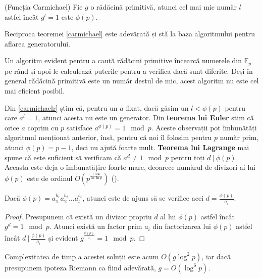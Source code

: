 \begin{thm}
  \label{carmichael}
  (Funcția Carmichael) Fie $g$ o rădăcină primitivă, atunci cel mai mic număr $l$ astfel încât $g^{l} = 1$ este $\phi(p)$.
\end{thm}

\begin{thm}
  \label{carmichaelr}
  Reciproca teoremei \ref{carmichael} este adevărată și stă la baza algoritmului pentru aflarea generatorului.
\end{thm}

Un algoritm evident pentru a caută rădăcini primitive încearcă numerele din $\mathbb{F}_{p}$ pe rând și apoi le calculează
puterile pentru a verifica dacă sunt diferite. Deși în general rădăcină primitivă este un număr destul de mic, acest algoritm
nu este cel mai eficient posibil.

Din \ref{carmichaelr} știm că, pentru un $a$ fixat, dacă găsim un $l < \phi(p)$ pentru care $a^{l} = 1$, atunci acesta nu este un
generator. Din \textbf{teorema lui Euler} știm că orice $a$ coprim cu $p$ satisface $a^{\phi(p)} = 1 \mod p$. Aceste observații pot
îmbunătăți algoritmul menționat anterior, însă, pentru că noi îl folosim pentru $p$ număr prim, atunci $\phi(p) = p - 1$, deci nu
ajută foarte mult. \textbf{Teorema lui Lagrange} mai spune că este suficient să verificam că $a^{d} \neq 1 \mod p$ pentru toți $d \ |\ \phi(p)$.
Aceasta este deja o îmbunatățire foarte mare, deoarece numărul de divizori ai lui $\phi(p)$ este de ordinul $O(p^{\frac{1.066}{\ln \ln p}})$ (\cite{numdivisors}).

Dacă $\phi(p) = a_{1}^{b_{1}} a_{2}^{b_{2}} \ldots a_{t}^{b_{t}}$, atunci este de ajuns să se verifice acei $d = \frac{\phi(p)}{a_{i}}$.

\begin{proof}
  Presupunem că există un divizor propriu $d$ al lui $\phi(p)$ astfel încât $g^{d} = 1 \mod p$. Atunci există un factor prim $a_{i}$
  din factorizarea lui $\phi(p)$ astfel încât $d \ | \ \frac{\phi(p)}{a_{i}}$ și evident $g^{\frac{\phi(p)}{a_{i}}} = 1 \mod p$.
\end{proof}

Complexitatea de timp a acestei soluții este acum $O(g \log^{2} p)$, iar dacă presupunem ipoteza Riemann ca fiind adevărată, $g = O(\log^{6} p)$.
